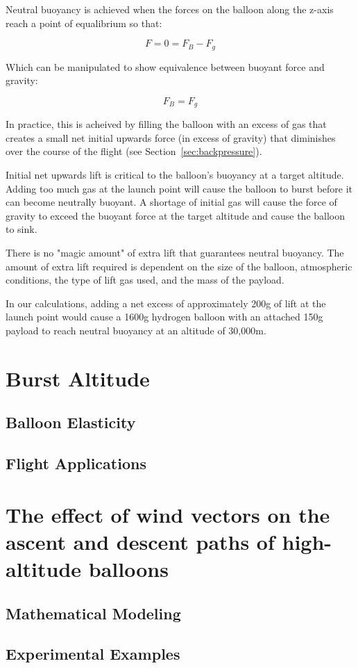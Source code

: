\documentclass[usaAMS,usenatbib]{mn2e}
\begin{document}
Neutral buoyancy is achieved when the forces on the balloon along the z-axis reach a point of equalibrium so that:

\begin{equation}
	F = 0 = F_B - F_g
\end{equation}

Which can be manipulated to show equivalence between buoyant force and gravity:

\begin{equation}
	F_B = F_g
\end{equation}

In practice, this is acheived by filling the balloon with an excess of gas that creates a small net initial upwards force (in excess of gravity) that diminishes over the course of the flight (see Section~\ref{sec:backpressure}).

Initial net upwards lift is critical to the balloon's buoyancy at a target altitude. Adding too much gas at the launch point will cause the balloon to burst before it can become neutrally buoyant. A shortage of initial gas will cause the force of gravity to exceed the buoyant force at the target altitude and cause the balloon to sink.

There is no "magic amount" of extra lift that guarantees neutral buoyancy. The amount of extra lift required is dependent on the size of the balloon, atmospheric conditions, the type of lift gas used, and the mass of the payload.

In our calculations, adding a net excess of approximately 200g of lift at the launch point would cause a 1600g hydrogen balloon with an attached 150g payload to reach neutral buoyancy at an altitude of 30,000m.

\section{Burst Altitude}

\subsection{Balloon Elasticity}

\subsection{Flight Applications}

\section{The effect of wind vectors on the ascent and descent paths of high-altitude balloons}

\subsection{Mathematical Modeling}

\subsection{Experimental Examples}

\label{lastpage}


\end{document}
